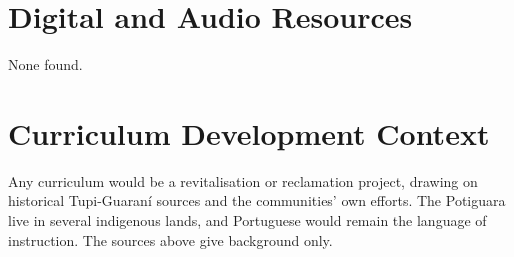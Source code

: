 \documentclass[12pt]{article}
\begin{document}
\section{Digital and Audio Resources}
None found.

\section{Curriculum Development Context}
Any curriculum would be a revitalisation or reclamation project, drawing on historical Tupi-Guaran\'i sources and the communities' own efforts. The Potiguara live in several indigenous lands, and Portuguese would remain the language of instruction. The sources above give background only.
\end{document}
